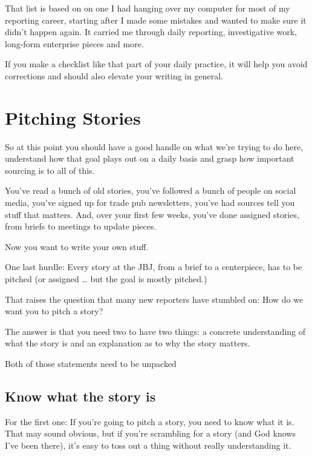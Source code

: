 \documentclass[
  11pt,
  american,
  letterpaperpaper,
  extrafontsizes,onecolumn,openright
  ]{memoir}
\begin{document}
That list is based on on one I had hanging over my computer for most of my reporting career, starting after I made some mistakes and wanted to make sure it didn't happen again. It carried me through daily reporting, investigative work, long-form enterprise pieces and more.

If you make a checklist like that part of your daily practice, it will help you avoid corrections and should also elevate your writing in general.

\hypertarget{pitching-stories}{%
\chapter{Pitching Stories}\label{pitching-stories}}

So at this point you should have a good handle on what we're trying to do here, understand how that goal plays out on a daily basis and grasp how important sourcing is to all of this.

You've read a bunch of old stories, you've followed a bunch of people on social media, you've signed up for trade pub newsletters, you've had sources tell you stuff that matters. And, over your first few weeks, you've done assigned stories, from briefs to meetings to update pieces.

Now you want to write your own stuff.

One last hurdle: Every story at the JBJ, from a brief to a centerpiece, has to be pitched (or assigned \ldots{} but the goal is mostly pitched.)

That raises the question that many new reporters have stumbled on: How do we want you to pitch a story?

The answer is that you need two to have two things: a concrete understanding of what the story is and an explanation as to why the story matters.

Both of those statements need to be unpacked

\hypertarget{know-what-the-story-is}{%
\section*{Know what the story is}\label{know-what-the-story-is}}

For the first one: If you're going to pitch a story, you need to know what it is. That may sound obvious, but if you're scrambling for a story (and God knows I've been there), it's easy to toss out a thing without really understanding it.
\end{document}
